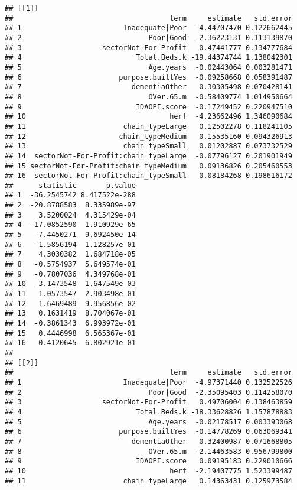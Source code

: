 \documentclass[]{article}
\begin{document}
\begin{verbatim}
## [[1]]
##                                     term     estimate   std.error
## 1                        Inadequate|Poor  -4.44707470 0.122662445
## 2                              Poor|Good  -2.36223131 0.113139870
## 3                   sectorNot-For-Profit   0.47441777 0.134777684
## 4                           Total.Beds.k -19.44374744 1.138042301
## 5                              Age.years  -0.02443064 0.003281471
## 6                       purpose.builtYes  -0.09258668 0.058391487
## 7                          dementiaOther   0.30305498 0.070428141
## 8                              OVer.65.m  -0.58409774 1.014950664
## 9                           IDAOPI.score  -0.17249452 0.220947510
## 10                                  herf  -4.23662496 1.346090684
## 11                       chain_typeLarge   0.12502278 0.118241105
## 12                      chain_typeMedium   0.15535160 0.094326913
## 13                       chain_typeSmall   0.01202887 0.073732529
## 14  sectorNot-For-Profit:chain_typeLarge  -0.07796127 0.201901949
## 15 sectorNot-For-Profit:chain_typeMedium   0.09136826 0.205460553
## 16  sectorNot-For-Profit:chain_typeSmall   0.08184268 0.198616172
##      statistic       p.value
## 1  -36.2545742 8.417522e-288
## 2  -20.8788583  8.335989e-97
## 3    3.5200024  4.315429e-04
## 4  -17.0852590  1.910929e-65
## 5   -7.4450271  9.692450e-14
## 6   -1.5856194  1.128257e-01
## 7    4.3030382  1.684718e-05
## 8   -0.5754937  5.649574e-01
## 9   -0.7807036  4.349768e-01
## 10  -3.1473548  1.647549e-03
## 11   1.0573547  2.903498e-01
## 12   1.6469489  9.956856e-02
## 13   0.1631419  8.704067e-01
## 14  -0.3861343  6.993972e-01
## 15   0.4446998  6.565367e-01
## 16   0.4120645  6.802921e-01
## 
## [[2]]
##                                     term     estimate   std.error
## 1                        Inadequate|Poor  -4.97371440 0.132522526
## 2                              Poor|Good  -2.35095403 0.114258070
## 3                   sectorNot-For-Profit   0.49706004 0.138463859
## 4                           Total.Beds.k -18.33628826 1.157878883
## 5                              Age.years  -0.02178517 0.003393068
## 6                       purpose.builtYes  -0.14778269 0.063069341
## 7                          dementiaOther   0.32400987 0.071668805
## 8                              OVer.65.m  -2.14463583 0.956799800
## 9                           IDAOPI.score   0.09195183 0.229010666
## 10                                  herf  -2.19407775 1.523399487
## 11                       chain_typeLarge   0.14363431 0.125973584

\end{verbatim}
\end{document}
